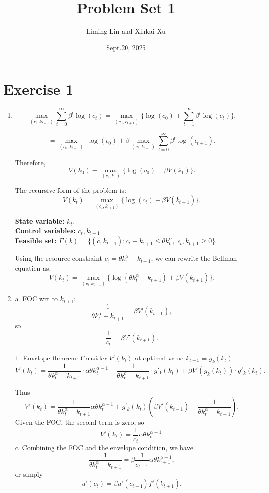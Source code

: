 \documentclass[12pt]{article}
\begin{document}
\title{Problem Set 1}
\author{Liming Lin and Xinkai Xu}
\date{Sept.20, 2025}
\maketitle

\section*{Exercise 1}

\begin{enumerate}[label=\textbf{Question \arabic*:}, leftmargin=*, align=left]

    \item  
    \[
\max_{(c_t,k_{t+1})} \sum_{t=0}^{\infty} \beta^t \log(c_t) 
= \max_{(c_0,k_{t+1})} \Big\{ \log(c_0) + \sum_{t=1}^{\infty} \beta^t \log(c_t) \Big\}.
\]

\[
= \max_{(c_0,k_{t+1})} \; \log(c_0) + \beta \max_{(c_t,k_{t+1})} \sum_{t=0}^{\infty} \beta^{t}\log(c_{t+1}).
\]

Therefore,
\[
V(k_0) = \max_{(c_0,k_1)} \Big\{ \log(c_0) + \beta V(k_1) \Big\}.
\]

The recursive form of the problem is:
\[
V(k_t) = \max_{(c_t,k_{t+1})} \Big\{ \log(c_t) + \beta V(k_{t+1}) \Big\}.
\]

\noindent
\textbf{State variable:} $k_t$. \\
\textbf{Control variables:} $c_t, k_{t+1}$.\\
\textbf{Feasible set:} $\Gamma(k) = \{(c,k_{t+1}) : c_t + k_{t+1} \leq \theta k_t^\alpha, \; c_t,k_{t+1} \geq 0 \}$.


Using the resource constraint $c_t = \theta k_t^\alpha - k_{t+1}$, we can rewrite the Bellman equation as:
\[
V(k_t) = \max_{(c_t,k_{t+1})} \Big\{ \log(\theta k_t^\alpha - k_{t+1}) + \beta V(k_{t+1}) \Big\}.
\]

    \item
    a. FOC wrt to $k_{t+1}$:
\[
\frac{1}{\theta k_t^\alpha - k_{t+1}} = \beta V'(k_{t+1}),
\]
so
\[
\frac{1}{c_t} = \beta V'(k_{t+1}).
\]

b. Envelope theorem:
Consider $V'(k_t)$ at optimal value $k_{t+1}=g_k(k_t)$
\[
V'(k_{t}) = \frac{1}{\theta k_{t}^\alpha - k_{t+1}} \cdot \alpha \theta k_{t}^{\alpha-1}-\frac{1}{\theta k_{t}^\alpha - k_{t+1}} \cdot g'_k(k_t)+\beta V'(g_k(k_t)) \cdot g'_k(k_{t}).
\]

Thus
\[
V'(k_{t}) = \frac{1}{\theta k_t^\alpha - k_{t+1}}\alpha \theta k_t^{\alpha-1}+g'_k(k_t)(\beta V'(k_{t+1})-\frac{1}{\theta k_{t}^\alpha - k_{t+1}}).
\]
Given the FOC, the second term is zero, so
\[
V'(k_{t}) = \frac{1}{c_t}\alpha \theta k_t^{\alpha-1}.
\]
c. Combining the FOC and the envelope condition, we have
\[
\frac{1}{\theta k_t^\alpha - k_{t+1}} = \beta \frac{1}{c_{t+1}}\alpha \theta k_{t+1}^{\alpha-1},
\]
or simply
\[
u'(c_t) = \beta u'(c_{t+1}) f'(k_{t+1}).
\]


\end{enumerate}
\end{document}
